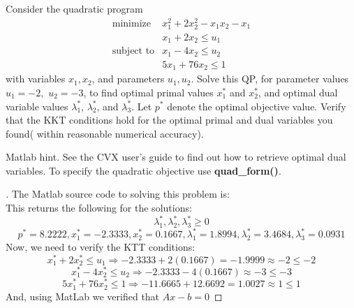 \begin{prob}[4.2]
  Consider the quadratic program
    \begin{eqnarray*}
      \mbox{minimize} & x_{1}^{2} + 2x_{2}^{2} - x_{1}x_{2} - x_{1}\\
      & x_{1} + 2x_{2} \leq u_{1}\\
      \mbox{subject to} & x_{1} - 4x_{2} \leq u_{2}\\
      & 5x_{1} + 76x_{2} \leq 1
    \end{eqnarray*}
    with variables $x_{1}, x_{2}$, and parameters $u_{1}, u_{2}$.
    Solve this QP, for parameter values $u_{1} = -2,$ $u_{2} = -3$, to find optimal primal values $x_{1}^{*}$ and $x_{2}^{*}$, and optimal dual variable values $\lambda_{1}^{*}$, $\lambda_{2}^{*}$, and $\lambda_{3}^{*}$. Let $p^{*}$ denote the optimal objective value. Verify that the KKT conditions hold for the optimal primal and dual variables you found( within reasonable numerical accuracy).

 Matlab hint. See the CVX user's guide to find out how to retrieve optimal dual variables. To specify the quadratic objective use \textbf{quad\_form()}.
\end{prob}

\begin{proof}[\sol]
  The Matlab source code to solving this problem is:\\
  
  This returns the following for the solutions:
   \[
   \lambda_{1}^{*},\lambda_{2}^{*},\lambda_{3}^{*} \geq 0
   \]
  \[
  p^{*} = 8.2222, x_{1}^{*}=-2.3333, x_{2}^{*}=0.1667, \lambda_{1}^{*}=1.8994,\lambda_{2}^{*}=3.4684,\lambda_{3}^{*}=0.0931
  \]
  Now, we need to verify the KTT conditions:\\
  \[
  x_{1}^{*} + 2x_{2}^{*} \leq u_{1} \Rightarrow -2.3333 + 2(0.1667) = -1.9999 \approx -2 \leq -2
  \]
  \[
   x_{1}^{*} - 4x_{2}^{*} \leq u_{2} \Rightarrow -2.3333 - 4(0.1667) \approx -3 \leq -3
   \]
   \[
   5x_{1}^{*} + 76x_{2}^{*} \leq 1 \Rightarrow -11.6665 + 12.6692 = 1.0027 \approx 1 \leq 1
   \]
   And, using MatLab we verified that $Ax - b = 0$
\end{proof}
